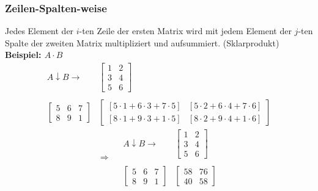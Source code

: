 \documentclass[12pt,a4paper]{article}
\begin{document}
\subsubsection{Zeilen-Spalten-weise}
Jedes Element der $i$-ten Zeile der ersten Matrix wird mit jedem Element der $j$-ten Spalte der zweiten Matrix multipliziert und aufsummiert. (Sklarprodukt) \\
\textbf{Beispiel: $A \cdot B$} \\
\[
\begin{matrix}
    A \downarrow B \rightarrow & \begin{bmatrix}
1 & 2 \\
3 & 4 \\
5 & 6
\end{bmatrix} \\ \\
\begin{bmatrix}
5 & 6 & 7\\
8 & 9 & 1
\end{bmatrix} & \begin{bmatrix}
[5 \cdot 1 + 6 \cdot 3 + 7 \cdot 5] & [5 \cdot 2 + 6 \cdot 4 + 7 \cdot 6] \\
[8 \cdot 1 + 9 \cdot 3 + 1 \cdot 5] & [8 \cdot 2 + 9 \cdot 4 + 1 \cdot 6]
\end{bmatrix}
\end{matrix}
\]
\[
\Rightarrow
\quad
\begin{matrix}
    A \downarrow B \rightarrow & \begin{bmatrix}
1 & 2 \\
3 & 4 \\
5 & 6
\end{bmatrix} \\ \\
\begin{bmatrix}
5 & 6 & 7\\
8 & 9 & 1
\end{bmatrix} & \begin{bmatrix}
    58 & 76 \\
    40 & 58
\end{bmatrix}
\end{matrix}
\]
\end{document}
